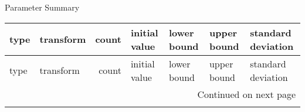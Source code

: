 \documentclass{article}
\begin{document}
\begin{center}
Parameter Summary
\end{center}
\begin{center}
\begin{landscape}
\begin{longtable}{llrllll}
\toprule
               type & transform &  count &  initial value &    lower bound &    upper bound & standard deviation \\
\midrule
\endfirsthead

\toprule
               type & transform &  count &  initial value &    lower bound &    upper bound & standard deviation \\
\midrule
\endhead
\midrule
\multicolumn{7}{r}{{Continued on next page}} \\
\midrule
\endfoot


\end{longtable}
\end{landscape}
\end{center}
\end{document}
